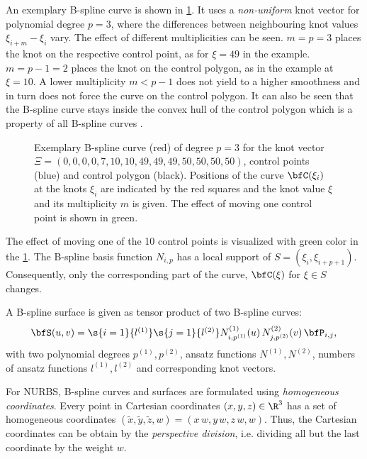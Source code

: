 An exemplary B-spline curve is shown in \cref{fig:bspline_curve}. It uses a \emph{non-uniform} knot vector for polynomial degree $p=3$, where the differences between neighbouring knot values $\xi_{i+m} - \xi_i$ vary. The effect of different multiplicities can be seen. $m=p=3$ places the knot on the respective control point, as for $\xi=49$ in the example. $m=p-1=2$ places the knot on the control polygon, as in the example at $\xi=10$. A lower multiplicity $m < p-1$ does not yield to a higher smoothness and in turn does not force the curve on the control polygon. It can also be seen that the B-spline curve stays inside the convex hull of the control polygon which is a property of all B-spline curves \cite{piegl2012nurbs}.
%
\begin{figure}%
  \centering%
  \def\svgwidth{8cm}%
  \caption{Exemplary B-spline curve (red) of degree $p=3$ for the knot vector $\Xi = (0,0,0,0,7,10,10,49,49,49,50,50,50,50)$, control points (blue) and control polygon (black).
  Positions of the curve $\bfC(\xi_i)$ at the knots $\xi_i$ are indicated by the red squares and the knot value $\xi$ and its multiplicity $m$ is given. The effect of moving one control point is shown in green.}%
  \label{fig:bspline_curve}%
\end{figure}%
%
The effect of moving one of the 10 control points is visualized with green color in the \cref{fig:bspline_curve}.
The B-spline basis function $N_{i,p}$ has a local support of $S=(\xi_i,\xi_{i+p+1})$. Consequently, only the corresponding part of the curve, $\bfC(\xi)$ for $\xi \in S$ changes.

A B-spline surface is given as tensor product of two B-spline curves:
\begin{equation}\label{eq:bspline_surface}
  \begin{array}{lll}
    \bfS(u,v) = \s{i=1}{l^{(1)}}\s{j=1}{l^{(2)}} N^{(1)}_{i,p^{(1)}}(u)\,N^{(2)}_{j,p^{(2)}}(v)\, \bfP_{i,j},
  \end{array}
\end{equation}
with two polynomial degrees $p^{(1)},p^{(2)}$, ansatz functions $N^{(1)}, N^{(2)}$, numbers of ansatz functions $l^{(1)}, l^{(2)}$ and corresponding knot vectors.

For NURBS, B-spline curves and surfaces are formulated using \emph{homogeneous coordinates}. Every point in Cartesian coordinates $(x,y,z) \in \R^3$ has a set of homogeneous coordinates $(\tilde{x},\tilde{y},\tilde{z},w)=(x\,w,y\,w,z\,w,w)$. Thus, the Cartesian coordinates can be obtain by the \emph{perspective division}, i.e. dividing all but the last coordinate by the weight $w$.


